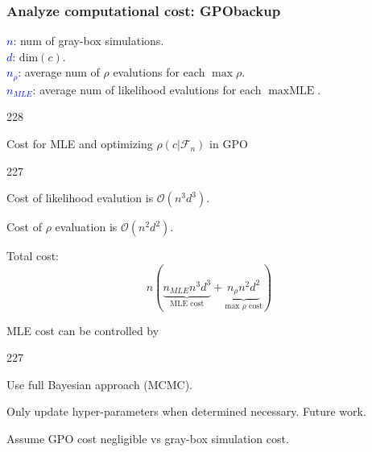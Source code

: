 \documentclass{beamer}
\let\oldcite=\cite
\renewcommand{\cite}[1]{\textcolor[rgb]{.4,.4,.85}{\oldcite{#1}}}
\newcommand{\barrow}{\item[\color{darkred}\ding{228}]}
\newcommand{\carrow}{\item[\color{darkred}\ding{227}]}
\begin{document}
\begin{frame}
    \frametitle{Analyze computational cost: GPO\hfill \scriptsize{backup}}\small
    \textcolor{blue}{$n$}: num of gray-box simulations.\\
    \textcolor{blue}{$d$}: $\textrm{dim}(c)$.\\
    \textcolor{blue}{$n_\rho$}: average num of $\rho$ evalutions for each $\max \rho$.\\
    \textcolor{blue}{$n_{MLE}$}: average num of likelihood evalutions for each $\max \textrm{MLE}$.
    \vspace{.1cm}
    \begin{dinglist}{228}
        \barrow Cost for MLE and optimizing $\rho(c\big|\mathcal{F}_n)$ in GPO
        \begin{dinglist}{227}
            \carrow Cost of likelihood evalution is $\mathcal{O}(n^3d^3)$.
            \carrow Cost of $\rho$ evaluation is $\mathcal{O}(n^2d^2)$.
            \carrow Total cost: 
            $$
                n\left( \underbrace{n_{MLE} n^3d^3}_{\textrm{MLE cost}} +
                \underbrace{n_\rho n^2 d^2}_{\textrm{max $\rho$ cost}} \right)
            $$
            \carrow MLE cost can be controlled by 
            \begin{dinglist}{227}
                \carrow Use full Bayesian approach \scriptsize \cite{Kennedy 01, Snoek 12} \small (MCMC).
                \carrow Only update hyper-parameters when determined necessary. Future work.
            \end{dinglist}
            \carrow Assume GPO cost negligible vs gray-box simulation cost.
        \end{dinglist}
    \end{dinglist}
\end{frame}
\end{document}
